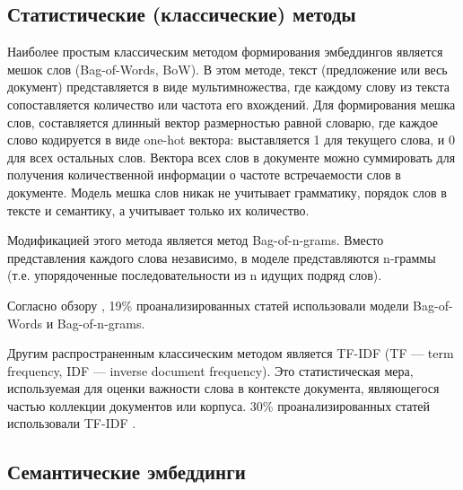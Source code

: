 \subsection{Статистические (классические) методы}

Наиболее простым классическим методом формирования эмбеддингов является мешок слов (Bag-of-Words, BoW). В этом методе, текст (предложение или весь документ) представляется в виде мультимножества, где каждому слову из текста сопоставляется количество или частота его вхождений. Для формирования мешка слов, составляется длинный вектор размерностью равной словарю, где каждое слово кодируется в виде one-hot вектора: выставляется 1 для текущего слова, и 0 для всех остальных слов. Вектора всех слов в документе можно суммировать для получения количественной информации о частоте встречаемости слов в документе. Модель мешка слов никак не учитывает грамматику, порядок слов в тексте и семантику, а учитывает только их количество.

Модификацией этого метода является метод Bag-of-n-grams. Вместо представления каждого слова независимо, в моделе представляются n-граммы (т.е. упорядоченные последовательности из n идущих подряд слов).

Согласно обзору \cite{no-patterns}, 19\% проанализированных статей использовали модели Bag-of-Words и Bag-of-n-grams.

Другим распространенным классическим методом является TF-IDF (TF — term frequency, IDF — inverse document frequency). Это статистическая мера, используемая для оценки важности слова в контексте документа, являющегося частью коллекции документов или корпуса. 30\% проанализированных статей использовали TF-IDF \cite{no-patterns}.

\subsection{Семантические эмбеддинги}

